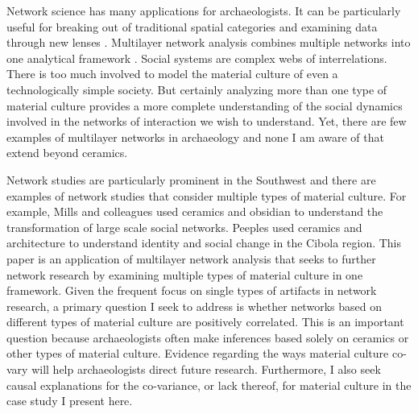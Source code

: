 \documentclass[]{interact}
\theoremstyle{plain}%
\theoremstyle{definition}
\theoremstyle{remark}
\begin{document}
Network science has many applications for archaeologists. It can be
particularly useful for breaking out of traditional spatial categories
and examining data through new lenses
\citep{Feinman2020-nf, Holland-Lulewicz2021-eb}. Multilayer network
analysis combines multiple networks into one analytical framework
\citep{Kivela2014-mh}. Social systems are complex webs of
interrelations. There is too much involved to model the material culture
of even a technologically simple society. But certainly analyzing more
than one type of material culture provides a more complete understanding
of the social dynamics involved in the networks of interaction we wish
to understand. Yet, there are few examples of multilayer networks in
archaeology \citep{Giomi2022-dn, Upton2019-yg} and none I am aware of
that extend beyond ceramics.

Network studies are particularly prominent in the Southwest and there
are examples of network studies that consider multiple types of material
culture. For example, Mills and colleagues \citeyearpar{Mills2013-gc}
used ceramics and obsidian to understand the transformation of large
scale social networks. Peeples \citeyearpar{Peeples2018-ib} used
ceramics and architecture to understand identity and social change in
the Cibola region. This paper is an application of multilayer network
analysis that seeks to further network research by examining multiple
types of material culture in one framework. Given the frequent focus on
single types of artifacts in network research, a primary question I seek
to address is whether networks based on different types of material
culture are positively correlated. This is an important question because
archaeologists often make inferences based solely on ceramics or other
types of material culture. Evidence regarding the ways material culture
co-vary will help archaeologists direct future research. Furthermore, I
also seek causal explanations for the co-variance, or lack thereof, for
material culture in the case study I present here.
\end{document}

